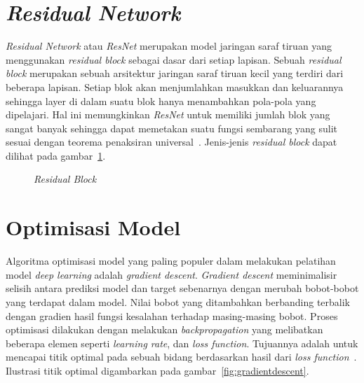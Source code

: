 \section{\textit{Residual Network}}
\label{sec:2-ResidualNetwork}

\textit{Residual Network} atau \textit{ResNet} merupakan model jaringan saraf tiruan yang menggunakan \textit{residual block}
sebagai dasar dari setiap lapisan. Sebuah \textit{residual block} merupakan sebuah arsitektur jaringan
saraf tiruan kecil yang terdiri dari beberapa lapisan. Setiap blok akan menjumlahkan masukkan dan
keluarannya sehingga layer di dalam suatu blok hanya menambahkan pola-pola yang dipelajari. Hal ini
memungkinkan \textit{ResNet} untuk memiliki jumlah blok yang sangat banyak sehingga dapat memetakan
suatu fungsi sembarang yang sulit sesuai dengan teorema penaksiran universal~\cite{2015arXiv151203385H}.
Jenis-jenis \textit{residual block} dapat dilihat pada gambar~\ref{fig:resblock}.

\begin{figure}[htbp]
    \begin{center}
    \end{center}
    \vspace{-20pt}
    \captionsetup{labelfont=bf, textfont=bf}
    \caption{\textit{Residual Block}}
    \vspace{-10pt}
    \captionsetup{labelfont=md, textfont=md}
    \label{fig:resblock}
\end{figure}

\section{Optimisasi Model}
\label{sec:2-OptimisasiModel}

Algoritma optimisasi model yang paling populer dalam melakukan pelatihan model \textit{deep learning}
adalah \textit{gradient descent}. \textit{Gradient descent} meminimalisir selisih antara prediksi
model dan target sebenarnya dengan merubah bobot-bobot yang terdapat dalam model. Nilai bobot yang
ditambahkan berbanding terbalik dengan gradien hasil fungsi kesalahan terhadap masing-masing bobot.
Proses optimisasi dilakukan dengan melakukan \textit{backpropagation} yang
melibatkan beberapa elemen seperti \textit{learning rate},
dan \textit{loss function}. Tujuannya adalah untuk mencapai titik optimal pada sebuah bidang berdasarkan
hasil dari \textit{loss function}~\cite{2016arXiv160100013G}. Ilustrasi titik optimal digambarkan
pada gambar~\ref{fig:gradientdescent}.

